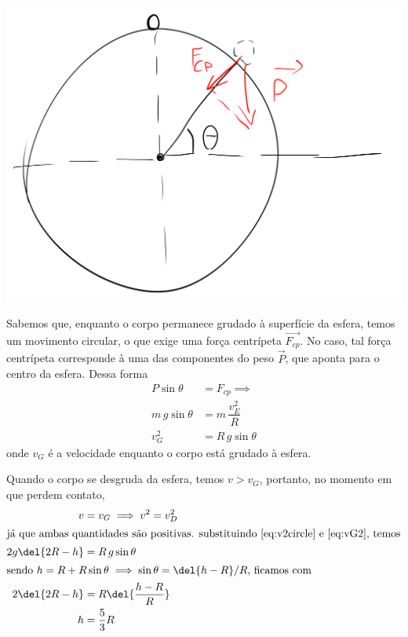 \documentclass[]{IMTexam}
\begin{document}
\begin{questions}
\begin{solution}
\begin{multi}
			\nextcol

			\includegraphics[width=1\linewidth]{fig8}

		\end{multi}

		Sabemos que, enquanto o corpo permanece grudado à superfície da esfera, temos um movimento circular, o que exige uma força centrípeta $ \vec{F_{cp}} $. No caso, tal força centrípeta corresponde à uma das componentes do peso $ \vec{P} $, que aponta para o centro da esfera. Dessa forma
		\begin{align}
			P\sin\theta    & = F_{cp}\implies \nonumber      \\
			m\,g\sin\theta & =m\,\dfrac{v_E^{2}}{R}\nonumber \\
			v_G^{2}        & =R\,g\sin\theta\label{eq:vG2}
		\end{align}
		onde $ v_G $ é a velocidade enquanto o corpo está grudado à esfera.

		Quando o corpo se desgruda da esfera, temos $ v>v_G $, portanto, no momento em que perdem contato,
		\begin{align*}
			v            & =v_G\implies v^{2}=v_D^{2} \\
			\intertext{já que ambas quantidades são positivas. substituindo \ref{eq:v2circle} e \ref{eq:vG2}, temos}
			2g\del{2R-h} & =R\,g\sin\theta            \\
			\intertext{sendo $ h=R+R\sin\theta\implies \sin\theta=\del{h-R}/R $, ficamos com}
			2\del{2R-h}  & =R\del{\dfrac{h-R}{R}}     \\
			h            & =\dfrac{5}{3}R
		\end{align*}
	\end{solution}


\end{questions}
\end{document}
